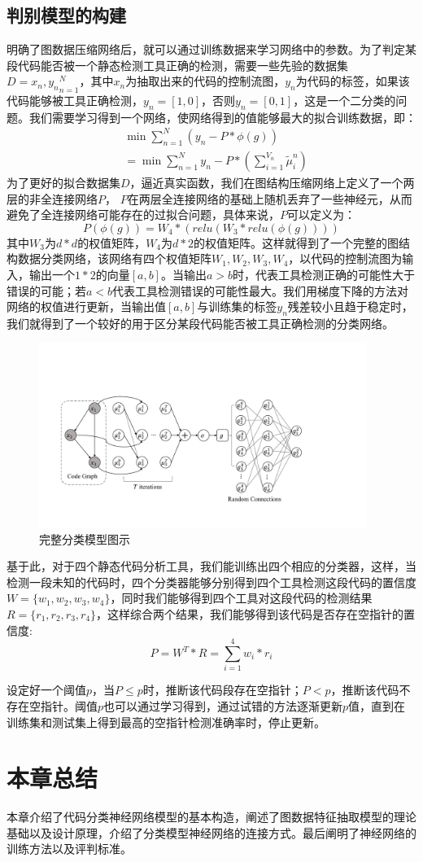 \subsection{判别模型的构建}
明确了图数据压缩网络后，就可以通过训练数据来学习网络中的参数。为了判定某段代码能否被一个静态检测工具正确的检测，需要一些先验的数据集 $D={x_n, y_n}_{n=1}^N$，其中$x_n$为抽取出来的代码的控制流图，$y_n$为代码的标签，如果该代码能够被工具正确检测，$y_n=[1, 0]$，否则$y_n=[0, 1]$，这是一个二分类的问题。我们需要学习得到一个网络，使网络得到的值能够最大的拟合训练数据，即：
\begin{align*}
&\min \sum_{n=1}^{N} (y_n - P*\phi(g))\\
&=\min \sum_{n=1}^{N} y_n - P*(\sum_{i=1}^{V_n} \tilde{\mu}_i^n)
\end{align*}
为了更好的拟合数据集$D$，逼近真实函数，我们在图结构压缩网络上定义了一个两层的非全连接网络$P$， $P$在两层全连接网络的基础上随机丢弃了一些神经元，从而避免了全连接网络可能存在的过拟合问题，具体来说，$P$可以定义为：
\begin{equation*}
P(\phi(g)) = W_4*(relu(W_3*relu(\phi(g))))
\end{equation*}
其中$W_3$为$d*d$的权值矩阵，$W_4$为$d*2$的权值矩阵。这样就得到了一个完整的图结构数据分类网络，该网络有四个权值矩阵$W_1, W_2, W_3, W_4$，以代码的控制流图为输入，输出一个$1*2$的向量$[a, b]$。当输出$a>b$时，代表工具检测正确的可能性大于错误的可能；若$a<b$代表工具检测错误的可能性最大。我们用梯度下降的方法对网络的权值进行更新，当输出值$[a, b]$与训练集的标签$y_n$残差较小且趋于稳定时，我们就得到了一个较好的用于区分某段代码能否被工具正确检测的分类网络。
\begin{figure}[htbp]
\begin{center}
\includegraphics[width=0.95\textwidth]{figures//6.pdf}
\caption{完整分类模型图示}
\label{default}
\end{center}
\end{figure}
\par 基于此，对于四个静态代码分析工具，我们能训练出四个相应的分类器，这样，当检测一段未知的代码时，四个分类器能够分别得到四个工具检测这段代码的置信度$W = \{w_1, w_2, w_3, w_4\}$，同时我们能够得到四个工具对这段代码的检测结果$R = \{r_1, r_2, r_3, r_4\}$，这样综合两个结果，我们能够得到该代码是否存在空指针的置信度:
$$P = W^T*R = \sum_{i=1}^4 w_i*r_i$$
\par 设定好一个阈值$p$，当$P\le p$时，推断该代码段存在空指针；$P<p$，推断该代码不存在空指针。阈值$p$也可以通过学习得到，通过试错的方法逐渐更新$p$值，直到在训练集和测试集上得到最高的空指针检测准确率时，停止更新。
\section{本章总结}
本章介绍了代码分类神经网络模型的基本构造，阐述了图数据特征抽取模型的理论基础以及设计原理，介绍了分类模型神经网络的连接方式。最后阐明了神经网络的训练方法以及评判标准。